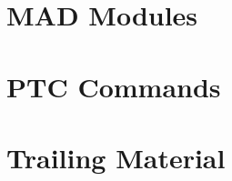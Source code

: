 \documentclass[11pt,a4paper,twoside]{report}
\begin{document}
\part{MAD Modules}                      %


\part{PTC Commands}                     %


%


\part{Trailing Material}

\end{document}
